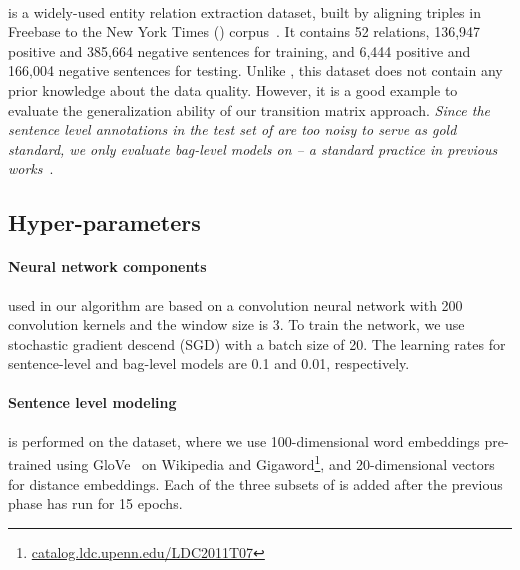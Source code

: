 \paragraph{\EntityRE} is a widely-used entity
relation extraction dataset, built %
by aligning triples
in Freebase to the New York Times (\NYT) corpus~\cite{riedel2010modeling}. It contains 52 relations, 136,947 positive and 385,664 negative sentences for training, and 6,444 positive and 166,004 negative sentences  for testing.
Unlike \TimeRE, this dataset does not contain any prior knowledge about the data quality.
However, it is a good example to evaluate the generalization ability of our transition matrix approach.
\emph{Since the sentence level annotations in the test set of \EntityRE are too noisy to serve as gold standard,  we only evaluate bag-level models on \EntityRE -- a standard practice in previous works}~\cite{surdeanu2012multi,zeng2015distant,lin2016neural}.



\subsection{Hyper-parameters}

\paragraph{Neural network components} used in our algorithm are based on a convolution neural network with 200 convolution kernels and the window size is 3. To train the network, we use stochastic gradient descend (SGD) with a batch size of 20.  The learning rates for sentence-level  and bag-level models are 0.1 and 0.01, respectively.

\paragraph{Sentence level modeling}
 is performed on the \TimeRE dataset, where we use 100-dimensional word embeddings pre-trained using GloVe~\cite{pennington2014glove} on Wikipedia and Gigaword\footnote{\url{catalog.ldc.upenn.edu/LDC2011T07}}, and 20-dimensional vectors for distance embeddings. Each of the three subsets of \TimeRE is added after the previous phase has run for 15 epochs. 

